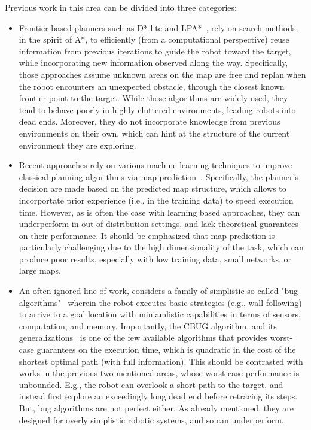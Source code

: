 \documentclass[12pt]{article}
\begin{document}
Previous work in this area can be divided into three categories:
\begin{itemize}
    \item Frontier-based planners such as D*-lite and LPA*~\cite{KOENIG200493,koenig2002d}, rely on search methods, in the spirit of A*, to efficiently (from a computational perspective) reuse information from previous iterations to guide the robot toward the target, while incorporating new information observed along the way. Specifically, those approaches assume unknown areas on the map are free and replan when the robot encounters an unexpected obstacle, through the closest known frontier point to the target. While those algorithms are widely used, they tend to behave poorly in highly cluttered environments, leading robots into dead ends. Moreover, they do not incorporate knowledge from previous environments on their own, which can hint at the structure of the current environment they are exploring. 
    \item Recent approaches rely on various machine learning techniques to improve classical planning algorithms via map prediction~\cite{wang2025cogniplan,ElhafsiIJP20,luperto2021exploration}. Specifically, the planner's decision are made based on the predicted map structure, which allows to incorportate prior experience (i.e., in the training data) to speed execution time. However, as is often the case with learning based approaches, they can underperform in out-of-distribution settings, and lack theoretical guarantees on their performance. It should be emphasized that map prediction is particularly challenging due to the high dimensionality of the task, which can produce poor results, especially with low training data, small networks, or large maps. 
    \item An often ignored line of work, considers a family of simplistic so-called "bug algorithms"~\cite{4389264, kamon1998tangentbug} wherein the robot executes basic strategies (e.g., wall following) to arrive to a goal location with miniamlistic capabilities in terms of sensors, computation, and memory. Importantly, the CBUG algorithm, and its generalizations~\cite{gabriely2005cbug,kramer2010multidimensional} is one of the few available algorithms that provides worst-case guarantees on the execution time, which is quadratic in the cost of the shortest optimal path (with full information). This should be contrasted with works in the previous two mentioned areas, whose worst-case performance is unbounded. E.g., the robot can overlook a short path to the target, and instead first explore an exceedingly long dead end before retracing its steps.  But, bug algorithms are not perfect either. As already mentioned, they are designed for overly simplistic robotic systems,  and so can underperform. 
\end{itemize}
\end{document}
